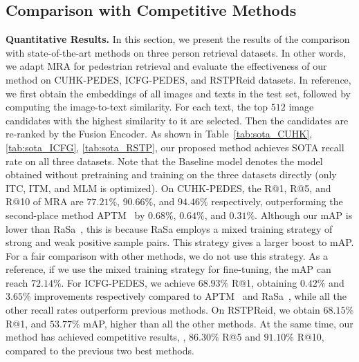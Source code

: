 \subsection{Comparison with Competitive Methods}
\noindent \textbf{Quantitative Results.} 
In this section, we present the results of the comparison with state-of-the-art methods on three person retrieval datasets. 
In other words, we adapt MRA for pedestrian retrieval and evaluate the effectiveness of our method on CUHK-PEDES, ICFG-PEDES, and RSTPReid datasets.
In reference, we first obtain the embeddings of all images and texts in the test set, followed by computing the image-to-text similarity. 
For each text, the top $512$ image candidates with the highest similarity to it are selected. 
Then the candidates are re-ranked by the Fusion Encoder. 
As shown in Table~\ref{tab:sota_CUHK}, \ref{tab:sota_ICFG}, \ref{tab:sota_RSTP}, our proposed method achieves SOTA recall rate on all three datasets. 
Note that the Baseline model denotes the model obtained without pretraining and training on the three datasets directly (only ITC, ITM, and MLM is optimized).
On CUHK-PEDES, the R@1, R@5, and R@10 of MRA are $77.21 \%$, $90.66 \%$, and $94.46 \%$ respectively, outperforming the second-place method APTM~\cite{yang2023towards} by $0.68 \%$, $0.64 \%$, and $0.31 \%$. 
Although our mAP is lower than RaSa~\cite{bai2023rasa}, this is because RaSa employs a mixed training strategy of strong and weak positive sample pairs. This strategy gives a larger boost to mAP. For a fair comparison with other methods, we do not use this strategy. As a reference, if we use the mixed training strategy for fine-tuning, the mAP can reach $72.14 \%$.
For ICFG-PEDES, we achieve $68.93 \%$ R@1, obtaining $0.42 \%$ and $3.65 \%$ improvements respectively compared to APTM~\cite{yang2023towards} and RaSa~\cite{bai2023rasa}, while all the other recall rates outperform previous methods.
On RSTPReid, we obtain $68.15 \%$ R@1, and $53.77 \%$ mAP, higher than all the other methods.
At the same time, our method has achieved competitive results, \ie, $86.30 \%$ R@5 and $91.10 \%$ R@10, compared to the previous two best methods. 






